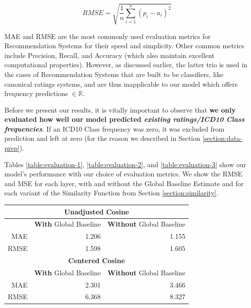 \documentclass[twoside,11pt]{article}
\newcommand*\circled[1]{\tikz[baseline=(char.base)]{
            \node[shape=circle,draw,inner sep=1pt] (char) {#1};}}
\begin{document}
{\begin{equation}
  RMSE = \sqrt{\frac{1}{n} \sum_{i = 1}^{n}(p_i - a_i)^2}
  \label{eq:rmse}
\end{equation}

MAE and RMSE are the most commonly used evaluation metrics for Recommendation Systems for their speed and simplicity. Other common metrics include Precision, Recall, and Accuracy (which also maintain excellent computational properties). However, as discussed earlier, the latter trio is used in the cases of Recommendation Systems that are built to be classifiers, like canonical ratings systems, and are thus inapplicable to our model which offers frequency predictions $\in\mathbb{R}$.

Before we present our results, it is vitally important to observe that \textbf{we only evaluated how well our model predicted \textit{existing ratings/ICD10 Class frequencies}}. If an ICD10 Class frequency was zero, it was excluded from prediction and left at zero (for the reason we described in Section \ref{section:data-prep}).

Tables \ref{table:evaluation-1}, \ref{table:evaluation-2}, and \ref{table:evaluation-3} show our model's performance with our choice of evaluation metrics. We show the RMSE and MSE for each layer, \circled{1} with and without the Global Baseline Estimate and \circled{2} for each variant of the Similarity Function from Section \ref{section:similarity}.

\begin{table}[H]
	\begin{center}
		\begin{tabular}{ |r||r|r| }
			\hline

			\multicolumn{3}{|c|}{\textbf{Unadjusted Cosine}} \\
			\hline\hline
    		& \textbf{With} Global Baseline & \textbf{Without} Global Baseline  \\
    		\hline
			MAE & 1.206 & 1.155 \\
			\hline
			RMSE & 1.598 & 1.605 \\

            \hline
            \hline

			\multicolumn{3}{|c|}{\textbf{Centered Cosine}} \\
			\hline\hline
    		& \textbf{With} Global Baseline & \textbf{Without} Global Baseline  \\
    		\hline
			MAE & 2.301 & 3.466 \\
			\hline
			RMSE & 6.368 & 8.327 \\


\end{tabular}
\end{center}
\end{table}}
\end{document}
